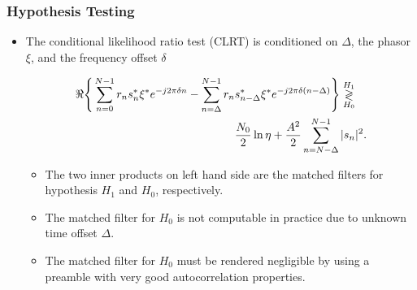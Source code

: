 \begin{frame}
    \frametitle{Hypothesis Testing}
    \begin{itemize}

      \item The conditional likelihood ratio test (CLRT) is conditioned on $\Delta$, the phasor $\xi$, and the frequency offset $\delta$
  
      \begin{equation*}
          \label{eq:log likelihood}
          \begin{aligned}
          \Re\Bigg\{\sum_{n=0}^{N-1}r_ns_n^*\xi^*e^{-j2\pi\delta n}-\sum_{n=\Delta}^{N-1}r_n&s_{n-\Delta}^*\xi^*e^{-j2\pi\delta(n-\Delta)}\Bigg\} \mathrel{\mathop\gtrless\limits^{H_1}_{H_0}} \\
          &\frac{N_0}{2}\ln\eta+\frac{A^2}{2}\sum_{n=N{-}\Delta}^{N-1}|s_n|^2.
          \end{aligned}
      \end{equation*}
  
      \begin{itemize}
          \item The two inner products on left hand side are the
            matched filters for hypothesis $H_1$ and $H_0$,
            respectively. 
          \item The matched filter for $H_0$ is not computable in
            practice due to unknown time offset  $\Delta$.
          \item The matched filter for $H_0$ must be rendered
            negligible by using a preamble with very good
            autocorrelation properties. 
      \end{itemize}
      
  \end{itemize}

\end{frame}

